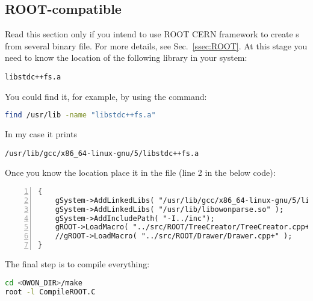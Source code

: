\subsection{ROOT-compatible}\label{ssec:install:ROOT}
Read this section only if you intend to use ROOT CERN framework to create s
from several binary file. For more details, see Sec.~\ref{ssec:ROOT}.
At this stage you need to know the location of the following library in your system:
\begin{lstlisting}
libstdc++fs.a
\end{lstlisting}
You could find it, for example, by using the  command:
\begin{lstlisting}[language=bash]
find /usr/lib -name "libstdc++fs.a"
\end{lstlisting}
In my case it prints 
\begin{lstlisting}
/usr/lib/gcc/x86_64-linux-gnu/5/libstdc++fs.a
\end{lstlisting}
Once you know the location place it in the  file
(line 2 in the below code):
\begin{lstlisting}[numbers=left]
{
    gSystem->AddLinkedLibs( "/usr/lib/gcc/x86_64-linux-gnu/5/libstdc++fs.a" );//place the correct path to the libstdc++fs.a
    gSystem->AddLinkedLibs( "/usr/lib/libowonparse.so" );
    gSystem->AddIncludePath( "-I../inc");
    gROOT->LoadMacro( "../src/ROOT/TreeCreator/TreeCreator.cpp+" );
    //gROOT->LoadMacro( "../src/ROOT/Drawer/Drawer.cpp+" );
}
\end{lstlisting}

The final step is to compile everything: 
\begin{lstlisting}[language=bash]
cd <OWON_DIR>/make
root -l CompileROOT.C
\end{lstlisting}

